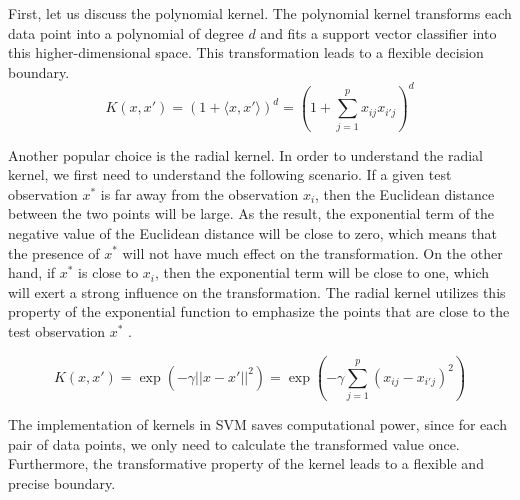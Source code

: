 First, let us discuss the polynomial kernel. The polynomial kernel transforms each data point into a polynomial
of degree $d$ and fits a support vector classifier into this higher-dimensional space. This 
transformation leads to a flexible decision boundary. 
\begin{equation}
    K(x, x') = (1 + \langle x, x' \rangle)^d = (1 + \sum_{j=1}^px_{ij}x_{i'j})^d
\end{equation}

Another popular choice is the radial kernel. In order to understand the radial kernel, we first need to understand
the following scenario.
If a given test observation $x^*$ is far away from the observation $x_i$,
then the Euclidean distance between the two points will be large.
As the result, the exponential term of the negative value of the Euclidean distance will be close to zero,
which means that the presence of $x^*$ will not have much effect on the transformation.
On the other hand, if $x^*$ is close to $x_i$, then the exponential term will be close to one, which
will exert a strong influence on the transformation. The radial kernel utilizes this property of the
exponential function to emphasize the points that are close to the test observation $x^*$ \cite{R9}.

\begin{equation}
    K(x, x') = \exp(-\gamma ||x - x'||^2) = \exp(-\gamma \sum_{j=1}^p(x_{ij} - x_{i'j})^2)
\end{equation}

The implementation of kernels in SVM saves computational power, since for each pair of data points, we
only need to calculate the transformed value once. Furthermore, the transformative property of the
kernel leads to a flexible and precise boundary. \cite{R9}
